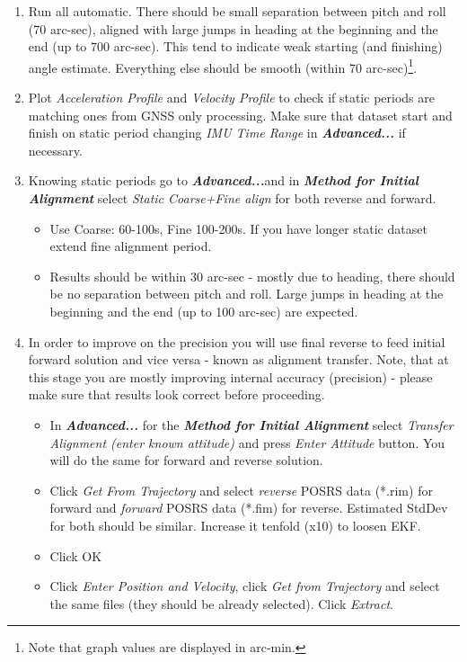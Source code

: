 \documentclass[11pt,fleqn]{book} %
\begin{document}
\begin{enumerate}
	\item Run all automatic. There should be small separation between pitch and roll (70 arc-sec), aligned with large jumps in heading at the beginning and the end (up to 700 arc-sec). This tend to indicate weak starting (and finishing) angle estimate. Everything else should be smooth (within 70 arc-sec)\footnote{Note that graph values are displayed in arc-min.}.
	\item Plot \emph{Acceleration Profile} and \emph{Velocity Profile} to check if static periods are matching ones from GNSS only processing. Make sure that dataset start and finish on static period changing \textit{IMU Time Range} in \textbf{\emph{Advanced...}} if necessary.
	\item Knowing static periods go to \textbf{\emph{Advanced...}}and in \textbf{\emph{Method for Initial Alignment}} select \emph{Static Coarse+Fine align} for both reverse and forward. 
	\begin{itemize}
		\item Use Coarse: 60-100s, Fine 100-200s. If you have longer static dataset extend fine alignment period. 
		\item Results should be within 30 arc-sec - mostly due to heading, there should be no separation between pitch and roll. Large jumps in heading at the beginning and the end (up to 100 arc-sec) are expected. 
	\end{itemize}
	\item In order to improve on the precision you will use final reverse to feed initial forward solution and vice versa - known as alignment transfer. Note, that at this stage you are mostly improving internal accuracy (precision) - please make sure that results look correct before proceeding.
	\begin{itemize}
		\item In \textbf{\emph{Advanced...}} for the \textbf{\emph{Method for Initial Alignment}} select \emph{Transfer Alignment (enter known attitude) }and press\emph{ Enter Attitude }button. You will do the same for forward and reverse solution.
		\item Click \emph{Get From Trajectory }and select \emph{reverse} POSRS data ({*}.rim) for forward and \emph{forward} POSRS data ({*}.fim) for reverse. Estimated StdDev for both should be similar. Increase it tenfold (x10) to loosen EKF. 
		\item Click OK
		\item Click \emph{Enter Position and Velocity}, click \emph{ Get from Trajectory} and select the same files (they should be already selected). Click \emph{Extract}.

\end{itemize}
\end{enumerate}
\end{document}
